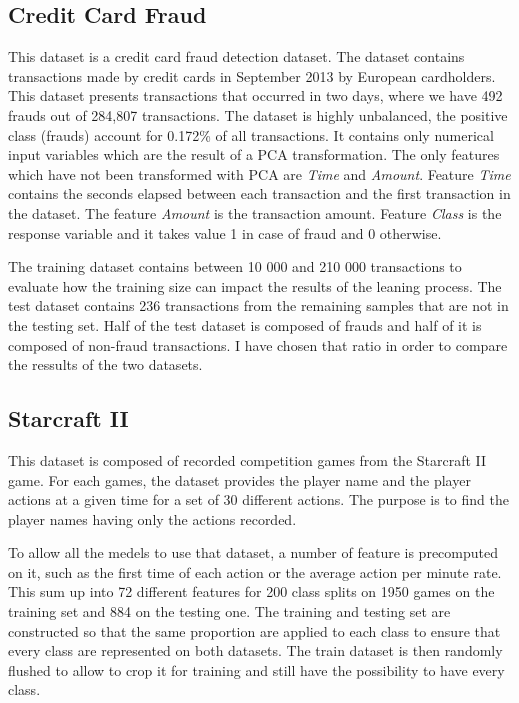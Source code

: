 \documentclass[twocolumn, a4paper, 10pt]{article}
\begin{document}
		\subsection*{Credit Card Fraud}
			This dataset is a credit card fraud detection dataset. The dataset contains transactions made by credit cards in September 2013 by European cardholders. This dataset presents transactions that occurred in two days, where we have 492 frauds out of 284,807 transactions. The dataset is highly unbalanced, the positive class (frauds) account for 0.172\% of all transactions. It contains only numerical input variables which are the result of a PCA transformation. The only features which have not been transformed with PCA are \textit{Time} and \textit{Amount}. Feature \textit{Time} contains the seconds elapsed between each transaction and the first transaction in the dataset. The feature \textit{Amount} is the transaction amount. Feature \textit{Class} is the response variable and it takes value 1 in case of fraud and 0 otherwise.

			The training dataset contains between 10 000 and 210 000 transactions to evaluate how the training size can impact the results of the leaning process. The test dataset contains 236 transactions from the remaining samples that are not in the testing set. Half of the test dataset is composed of frauds and half of it is composed of non-fraud transactions. I have chosen that ratio in order to compare the ressults of the two datasets.
		\subsection*{Starcraft II}
			This dataset is composed of recorded competition games from the Starcraft II game. For each games, the dataset provides the player name and the player actions at a given time for a set of 30 different actions. The purpose is to find the player names having only the actions recorded.

			To allow all the medels to use that dataset, a number of feature is precomputed on it, such as the first time of each action or the average action per minute rate. This sum up into 72 different features for 200 class splits on 1950 games on the training set and 884 on the testing one. The training and testing set are constructed so that the same proportion are applied to each class to ensure that every class are represented on both datasets. The train dataset is then randomly flushed to allow to crop it for training and still have the possibility to have every class.
\end{document}
